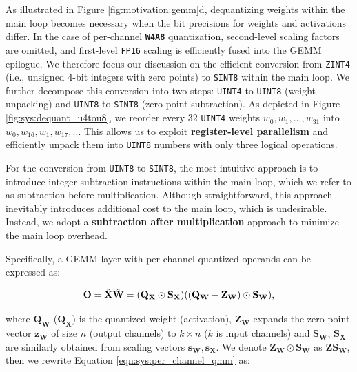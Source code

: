 As illustrated in Figure \ref{fig:motivation:gemm}d, dequantizing weights within the main loop becomes necessary when the bit precisions for weights and activations differ. In the case of per-channel \textbf{\texttt{W4A8}} quantization, second-level scaling factors are omitted, and first-level \texttt{FP16} scaling is efficiently fused into the GEMM epilogue. We therefore focus our discussion on the efficient conversion from \texttt{ZINT4} (i.e., unsigned 4-bit integers with zero points) to \texttt{SINT8} within the main loop. We further decompose this conversion into two steps: \texttt{UINT4} to \texttt{UINT8} (weight unpacking) and \texttt{UINT8} to \texttt{SINT8} (zero point subtraction). As depicted in Figure \ref{fig:sys:dequant_u4tou8}, we reorder every 32 \texttt{UINT4} weights $w_0, w_1, ..., w_{31}$ into $w_0, w_{16}, w_1, w_{17}, ...$ This allows us to exploit \textbf{register-level parallelism} and efficiently unpack them into \texttt{UINT8} numbers with only three logical operations.

For the conversion from \texttt{UINT8} to \texttt{SINT8}, the most intuitive approach is to introduce integer subtraction instructions within the main loop, which we refer to as subtraction before multiplication. Although straightforward, this approach inevitably introduces additional cost to the main loop, which is undesirable. Instead, we adopt a \textbf{subtraction after multiplication} approach to minimize the main loop overhead.

Specifically, a GEMM layer with per-channel quantized operands can be expressed as:

\vspace{-17pt}
\begin{equation}
\small \mathbf{O} = \hat{\mathbf{X}}\hat{\mathbf{W}} = (\mathbf{Q}_\mathbf{X}\odot\mathbf{S}_\mathbf{X})((\mathbf{Q}_\mathbf{W} - \mathbf{Z}_\mathbf{W})\odot\mathbf{S}_\mathbf{W}),  
\label{eqn:sys:per_channel_qmm}
\end{equation}

\vspace{-10pt}
where $\mathbf{Q}_\mathbf{W}$ ($\mathbf{Q}_\mathbf{X}$) is the quantized weight (activation), $\mathbf{Z}_\mathbf{W}$ expands the zero point vector $\mathbf{z}_\mathbf{W}$ of size $n$ (output channels) to $k\times n$ ($k$ is input channels) and $\mathbf{S}_\mathbf{W}$, $\mathbf{S}_\mathbf{X}$ are similarly obtained from scaling vectors $\mathbf{s}_\mathbf{W},\mathbf{s}_\mathbf{X}$. We denote $\mathbf{Z}_\mathbf{W}\odot\mathbf{S}_\mathbf{W}$ as $\mathbf{ZS}_\mathbf{W}$, then we rewrite Equation \ref{eqn:sys:per_channel_qmm} as:

